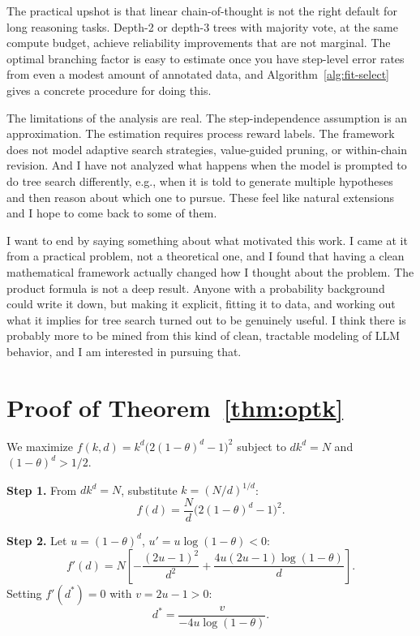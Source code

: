 \documentclass[11pt]{article}
\theoremstyle{plain}
\theoremstyle{definition}
\begin{document}
The practical upshot is that linear chain-of-thought is not the right default
for long reasoning tasks. Depth-2 or depth-3 trees with majority vote, at the
same compute budget, achieve reliability improvements that are not marginal.
The optimal branching factor is easy to estimate once you have step-level error
rates from even a modest amount of annotated data, and Algorithm~\ref{alg:fit-select}
gives a concrete procedure for doing this.

The limitations of the analysis are real. The step-independence assumption is
an approximation. The estimation requires process reward labels. The framework
does not model adaptive search strategies, value-guided pruning, or within-chain
revision. And I have not analyzed what happens when the model is prompted to
do tree search differently, e.g., when it is told to generate multiple hypotheses
and then reason about which one to pursue. These feel like natural extensions
and I hope to come back to some of them.

I want to end by saying something about what motivated this work. I came at it
from a practical problem, not a theoretical one, and I found that having a
clean mathematical framework actually changed how I thought about the problem.
The product formula is not a deep result. Anyone with a probability background
could write it down, but making it explicit, fitting it to data, and working
out what it implies for tree search turned out to be genuinely useful. I think
there is probably more to be mined from this kind of clean, tractable modeling
of LLM behavior, and I am interested in pursuing that.




\appendix

\section{Proof of Theorem~\ref{thm:optk}}
\label{app:optk-proof}

We maximize $f(k,d) = k^d\bigl(2(1-\theta)^d - 1\bigr)^2$ subject to
$dk^d = N$ and $(1-\theta)^d > 1/2$.

\textbf{Step 1.} From $dk^d = N$, substitute $k = (N/d)^{1/d}$:
\[
  f(d) = \frac{N}{d}\bigl(2(1-\theta)^d - 1\bigr)^2.
\]

\textbf{Step 2.} Let $u = (1-\theta)^d$, $u' = u\log(1-\theta) < 0$:
\[
  f'(d) = N\!\left[-\frac{(2u-1)^2}{d^2} + \frac{4u(2u-1)\log(1-\theta)}{d}\right].
\]
Setting $f'(d^*) = 0$ with $v = 2u-1 > 0$:
\[
  d^* = \frac{v}{-4u\log(1-\theta)}.
\]
\end{document}
